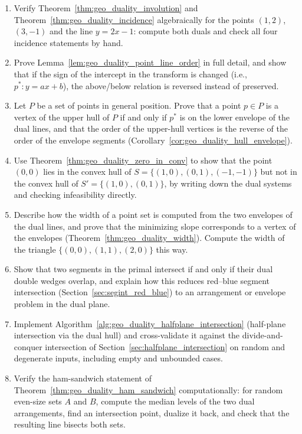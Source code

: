 \begin{enumerate}
  \item Verify Theorem~\ref{thm:geo_duality_involution} and
    Theorem~\ref{thm:geo_duality_incidence} algebraically for the points
    $(1,2)$, $(3,-1)$ and the line $y = 2x - 1$: compute both duals and
    check all four incidence statements by hand.
  \item Prove Lemma~\ref{lem:geo_duality_point_line_order} in full detail,
    and show that if the sign of the intercept in the transform is changed
    (i.e., $p^* : y = ax + b$), the above/below relation is reversed instead
    of preserved.
  \item Let $P$ be a set of points in general position. Prove that a point
    $p \in P$ is a vertex of the upper hull of $P$ if and only if $p^*$ is on
    the lower envelope of the dual lines, and that the order of the upper-hull
    vertices is the reverse of the order of the envelope segments
    (Corollary~\ref{cor:geo_duality_hull_envelope}).
  \item Use Theorem~\ref{thm:geo_duality_zero_in_conv} to show that the
    point $(0,0)$ lies in the convex hull of $S = \{(1,0),(0,1),(-1,-1)\}$
    but not in the convex hull of $S' = \{(1,0),(0,1)\}$, by writing down the
    dual systems and checking infeasibility directly.
  \item Describe how the width of a point set is computed from the two
    envelopes of the dual lines, and prove that the minimizing slope
    corresponds to a vertex of the envelopes
    (Theorem~\ref{thm:geo_duality_width}). Compute the width of the triangle
    $\{(0,0),(1,1),(2,0)\}$ this way.
  \item Show that two segments in the primal intersect if and only if their
    dual double wedges overlap, and explain how this reduces red--blue
    segment intersection (Section~\ref{sec:segint_red_blue}) to an
    arrangement or envelope problem in the dual plane.
  \item Implement Algorithm~\ref{alg:geo_duality_halfplane_intersection}
    (half-plane intersection via the dual hull) and cross-validate it against
    the divide-and-conquer intersection of
    Section~\ref{sec:halfplane_intersection} on random and degenerate
    inputs, including empty and unbounded cases.
  \item Verify the ham-sandwich statement of
    Theorem~\ref{thm:geo_duality_ham_sandwich} computationally: for random
    even-size sets $A$ and $B$, compute the median levels of the two dual
    arrangements, find an intersection point, dualize it back, and check that
    the resulting line bisects both sets.
\end{enumerate}

